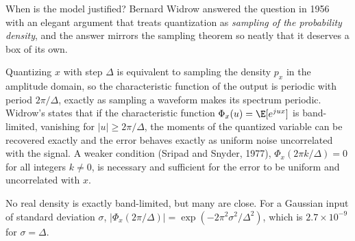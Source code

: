 When is the model justified? Bernard Widrow answered the question in 1956 with an elegant
argument that treats quantization as \emph{sampling of the probability density}, and the answer
mirrors the sampling theorem so neatly that it deserves a box of its own.


\begin{deeper}
Quantizing $x$ with step $\Delta$ is equivalent to sampling the density $p_x$ in the amplitude
domain, so the characteristic function of the output is periodic with period $2\pi/\Delta$, exactly
as sampling a waveform makes its spectrum periodic. Widrow's  states
that if the characteristic function $\Phi_x(u)=\E[e^{jux}]$ is band-limited, vanishing for
$|u|\ge2\pi/\Delta$, the moments of the quantized variable can be recovered exactly and the
error behaves exactly as uniform noise uncorrelated with the signal. A weaker condition
(Sripad and Snyder, 1977), $\Phi_x(2\pi k/\Delta)=0$ for all integers $k\ne0$, is necessary
and sufficient for the error to be uniform and uncorrelated with $x$.

No real density is exactly band-limited, but many are close. For a Gaussian input of
standard deviation $\sigma$, $|\Phi_x(2\pi/\Delta)|=\exp(-2\pi^2\sigma^2/\Delta^2)$, which is
$2.7\times10^{-9}$ for $\sigma=\Delta$.
\end{deeper}

